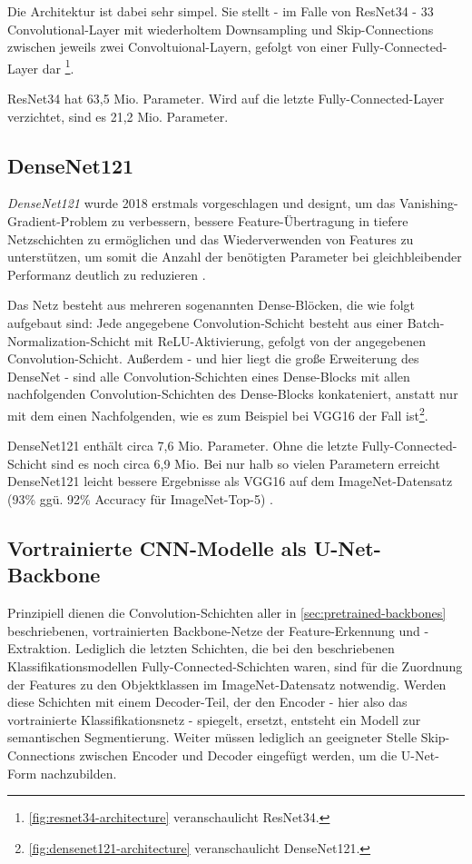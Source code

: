 Die Architektur ist dabei sehr simpel. Sie stellt - im Falle von ResNet34 - 33 Convolutional-Layer mit wiederholtem Downsampling 
und Skip-Connections zwischen jeweils zwei Convoltuional-Layern, gefolgt von einer Fully-Connected-Layer dar \cite{He.10122015}\footnote{\autoref{fig:resnet34-architecture} veranschaulicht ResNet34.}.

ResNet34 hat 63,5 Mio. Parameter. Wird auf die letzte Fully-Connected-Layer verzichtet, sind es 21,2 Mio. Parameter.

\subsection{DenseNet121} \label{sec:pretrained-backbones:densenet121}

\textit{DenseNet121} wurde 2018 erstmals vorgeschlagen und designt, um das Vanishing-Gradient-Problem 
zu verbessern, bessere Feature-Übertragung in tiefere Netzschichten zu ermöglichen und das Wiederverwenden von Features 
zu unterstützen, um somit die Anzahl der benötigten Parameter bei gleichbleibender Performanz deutlich zu reduzieren \cite{Huang.25082016}.

Das Netz besteht aus mehreren sogenannten Dense-Blöcken, die wie folgt aufgebaut sind: 
Jede angegebene Convolution-Schicht besteht aus einer Batch-Normalization-Schicht mit \ac{ReLU}-Aktivierung,
gefolgt von der angegebenen Convolution-Schicht. Außerdem - und hier liegt die große Erweiterung des DenseNet - sind alle 
Convolution-Schichten eines Dense-Blocks mit allen nachfolgenden Convolution-Schichten des Dense-Blocks konkateniert,
anstatt nur mit dem einen Nachfolgenden, wie es zum Beispiel bei VGG16 der Fall ist\footnote{\autoref{fig:densenet121-architecture} veranschaulicht DenseNet121.}. 

DenseNet121 enthält circa 7,6 Mio. Parameter. Ohne die letzte Fully-Connected-Schicht sind es noch circa 6,9 Mio. 
Bei nur halb so vielen Parametern erreicht DenseNet121 leicht bessere Ergebnisse als VGG16 auf dem ImageNet-Datensatz 
(93\% ggü. 92\% Accuracy für ImageNet-Top-5) \cite{Huang.25082016}. 

\subsection{Vortrainierte CNN-Modelle als U-Net-Backbone} \label{sec:pretrained-as-unet-backbone}

Prinzipiell dienen die Convolution-Schichten aller in \autoref{sec:pretrained-backbones} beschriebenen, vortrainierten Backbone-Netze 
der Feature-Erkennung und -Extraktion. Lediglich die letzten Schichten, die bei den beschriebenen Klassifikationsmodellen  
Fully-Connected-Schichten waren, sind für die Zuordnung der Features zu den Objektklassen 
im ImageNet-Datensatz notwendig. Werden diese Schichten mit einem Decoder-Teil, der den Encoder - hier 
also das vortrainierte Klassifikationsnetz - spiegelt, ersetzt, entsteht ein Modell zur semantischen Segmentierung. 
Weiter müssen lediglich an geeigneter Stelle Skip-Connections zwischen Encoder und Decoder eingefügt werden,
um die U-Net-Form nachzubilden. 



